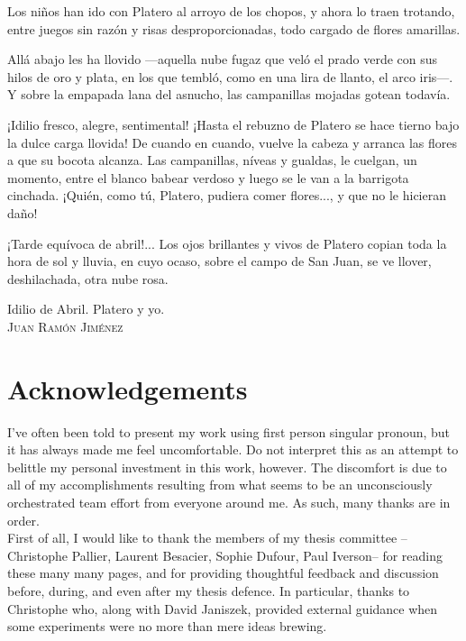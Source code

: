 \documentclass[12pt, twoside]{report}
\begin{document}
\epigraph{Los niños han ido con Platero al arroyo de los chopos, y ahora lo traen trotando, entre juegos sin razón y risas desproporcionadas, todo cargado de flores amarillas.
  
  Allá abajo les ha llovido —aquella nube fugaz que veló el prado verde con sus hilos de oro y plata, en los que tembló, como en una lira de llanto, el arco iris—. Y sobre la empapada lana del asnucho, las campanillas mojadas gotean todavía.

  ¡Idilio fresco, alegre, sentimental! ¡Hasta el rebuzno de Platero se hace tierno bajo la dulce carga llovida! De cuando en cuando, vuelve la cabeza y arranca las flores a que su bocota alcanza. Las campanillas, níveas y gualdas, le cuelgan, un momento, entre el blanco babear verdoso y luego se le van a la barrigota cinchada. ¡Quién, como tú, Platero, pudiera comer flores..., y que no le hicieran daño!

    ¡Tarde equívoca de abril!... Los ojos brillantes y vivos de Platero copian toda la hora de sol y lluvia, en cuyo ocaso, sobre el campo de San Juan, se ve llover, deshilachada, otra nube rosa.}{Idilio de Abril. Platero y yo. \\ \textsc{Juan Ramón Jiménez}}


\chapter*{Acknowledgements}
I've often been told to present my work %
using first person singular pronoun, but it has always made me feel uncomfortable. Do not interpret this as an attempt to belittle my personal investment in this work, however. The discomfort is due to all of my accomplishments resulting from what seems to be an unconsciously orchestrated team effort from everyone around me. As such, many thanks are in order. \\

First of all, I would like to thank the members of my thesis committee --Christophe Pallier, Laurent Besacier, Sophie Dufour, Paul Iverson-- for reading these many many pages, and for providing thoughtful feedback and discussion before, during, and even after my thesis defence. In particular, thanks to Christophe who, along with David Janiszek, provided external guidance when some experiments were no more than mere ideas brewing.    
\end{document}
